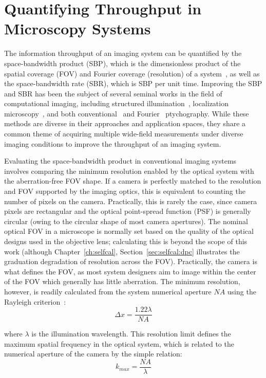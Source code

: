 \section{Quantifying Throughput in Microscopy Systems}
The information throughput of an imaging system can be quantified by the space-bandwidth product (SBP), which is the dimensionless product of the spatial coverage (FOV) and Fourier coverage (resolution) of a system~\cite{Lohmann1996space}, as well as the space-bandwidth rate (SBR), which is SBP per unit time. Improving the SBP and SBR has been the subject of several seminal works in the field of computational imaging, including structured illumination~\cite{gustafsson2000surpassing}, localization microscopy~\cite{Rust:06, betzig2006imaging}, and both conventional~\cite{rodenburg2004phase} and Fourier~\cite{Zheng2013,tian2015computational,Tian2014} ptychography. While these methods are diverse in their approaches and application spaces, they share a common theme of acquiring multiple wide-field measurements under diverse imaging conditions to improve the throughput of an imaging system.

Evaluating the space-bandwidth product in conventional imaging systems involves comparing the minimum resolution enabled by the optical system with the aberration-free FOV shape. If a camera is perfectly matched to the resolution and FOV supported by the imaging optics, this is equivalent to counting the number of pixels on the camera. Practically, this is rarely the case, since camera pixels are rectangular and the optical point-spread function (PSF) is generally circular (owing to the circular shape of most camera apertures). The nominal optical FOV in a microscope is normally set based on the quality of the optical designs used in the objective lens; calculating this is beyond the scope of this work (although Chapter~\ref{ch:selfcal}, Section~\ref{sec:selfcal:dpc} illustrates the graduation degradation of resolution across the FOV). Practically, the camera is what defines the FOV, as most system designers aim to image within the center of the FOV which generally has little aberration. The minimum resolution, however, is readily calculated from the system numerical aperture $NA$ using the Rayleigh criterion~\cite{rayleigh1896xv}:
\begin{equation}\label{eq:highthtoughput_rayleigh}
    \Delta x = \frac{1.22 \lambda}{NA}
\end{equation}

\noindent where $\lambda$ is the illumination wavelength. This resolution limit defines the maximum spatial frequency in the optical system, which is related to the numerical aperture of the camera by the simple relation:
\begin{equation}
    k_{max} = \frac{NA}{\lambda}
\end{equation}

